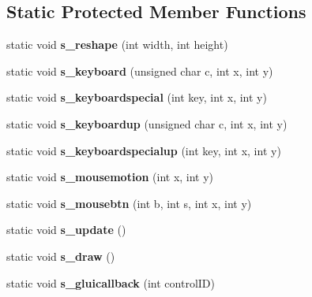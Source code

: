 \subsection*{Static Protected Member Functions}
\begin{DoxyCompactItemize}
\item 
\hypertarget{classBaseGfxApp_a5fe6a77d37044cbe28647ed3391bbb7a}{static void {\bfseries s\-\_\-reshape} (int width, int height)}\label{classBaseGfxApp_a5fe6a77d37044cbe28647ed3391bbb7a}

\item 
\hypertarget{classBaseGfxApp_a52edb2569227319feb68779844e7d857}{static void {\bfseries s\-\_\-keyboard} (unsigned char c, int x, int y)}\label{classBaseGfxApp_a52edb2569227319feb68779844e7d857}

\item 
\hypertarget{classBaseGfxApp_a1e8d90a4faab60300ddf2a4ea9b83115}{static void {\bfseries s\-\_\-keyboardspecial} (int key, int x, int y)}\label{classBaseGfxApp_a1e8d90a4faab60300ddf2a4ea9b83115}

\item 
\hypertarget{classBaseGfxApp_aa1ca205af9d6cee33949f2e6adf4c923}{static void {\bfseries s\-\_\-keyboardup} (unsigned char c, int x, int y)}\label{classBaseGfxApp_aa1ca205af9d6cee33949f2e6adf4c923}

\item 
\hypertarget{classBaseGfxApp_a0e4dfe006f3cc9126c1cc8ad32784f75}{static void {\bfseries s\-\_\-keyboardspecialup} (int key, int x, int y)}\label{classBaseGfxApp_a0e4dfe006f3cc9126c1cc8ad32784f75}

\item 
\hypertarget{classBaseGfxApp_a5e640f2394f7e038d0dd2b469d5c2e24}{static void {\bfseries s\-\_\-mousemotion} (int x, int y)}\label{classBaseGfxApp_a5e640f2394f7e038d0dd2b469d5c2e24}

\item 
\hypertarget{classBaseGfxApp_a22dd953bfb75add9fd0f8f2f8be535c5}{static void {\bfseries s\-\_\-mousebtn} (int b, int s, int x, int y)}\label{classBaseGfxApp_a22dd953bfb75add9fd0f8f2f8be535c5}

\item 
\hypertarget{classBaseGfxApp_a38ab80de2e628af3093805b94858fc32}{static void {\bfseries s\-\_\-update} ()}\label{classBaseGfxApp_a38ab80de2e628af3093805b94858fc32}

\item 
\hypertarget{classBaseGfxApp_a58415c6151a2a80e1fe2eaa9919a4dab}{static void {\bfseries s\-\_\-draw} ()}\label{classBaseGfxApp_a58415c6151a2a80e1fe2eaa9919a4dab}

\item 
\hypertarget{classBaseGfxApp_ad4a963321f1147d68369225ab0c7f32f}{static void {\bfseries s\-\_\-gluicallback} (int control\-I\-D)}\label{classBaseGfxApp_ad4a963321f1147d68369225ab0c7f32f}

\end{DoxyCompactItemize}
